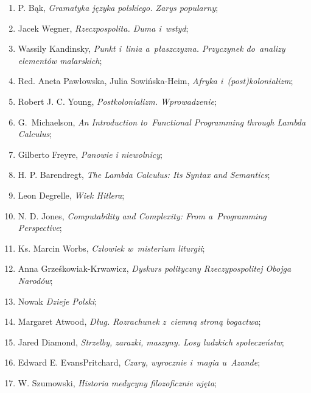 \documentclass[a4paper,11pt]{article}
\begin{document}
\begin{enumerate}
\item P. Bąk, \emph{Gramatyka języka polskiego. Zarys popularny};

\item Jacek Wegner, \emph{Rzeczpospolita. Duma i~wstyd};

\item Wassily Kandinsky, \emph{Punkt i~linia a~płaszczyzna. Przyczynek
    do~analizy elementów malarskich};

\item Red. Aneta Pawłowska, Julia Sowińska-Heim, \emph{Afryka
    i~(post)kolonializm};

\item Robert J. C. Young, \emph{Postkolonializm. Wprowadzenie};

\item G.~Michaelson, \emph{An Introduction to~Functional Programming
    through Lambda Calculus};

\item Gilberto Freyre, \emph{Panowie i niewolnicy};

\item H. P. Barendregt, \emph{The Lambda Calculus: Its Syntax and
    Semantics};

\item Leon Degrelle, \emph{Wiek Hitlera};

\item N. D. Jones, \emph{Computability and Complexity: From
    a~Programming Perspective};

\item Ks. Marcin Worbs, \emph{Człowiek w~misterium liturgii};

\item Anna Grześkowiak-Krwawicz, \emph{Dyskurs polityczny
    Rzeczypospolitej Obojga Narodów};

\item Nowak \emph{Dzieje Polski};

\item Margaret Atwood, \emph{Dług. Rozrachunek z~ciemną stroną
    bogactwa};

\item Jared Diamond, \emph{Strzelby, zarazki, maszyny. Losy ludzkich
    społeczeństw};

\item Edward E. Evans\dywiz Pritchard, \emph{Czary, wyrocznie i~magia
    u~Azande};

\item W. Szumowski, \emph{Historia medycyny filozoficznie ujęta};


\end{enumerate}
\end{document}
